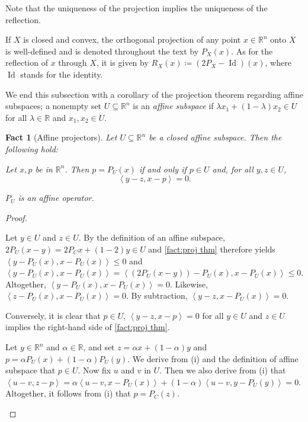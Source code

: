 \documentclass[smallextended,numbook,nospthms]{svjour3}
\theoremstyle{plain}
\newtheorem{fact}[theorem]{Fact}
\theoremstyle{definition}
\def\RR{\mathds R}
\DeclareMathOperator{\Id}{Id}
\newcommand{\scal}[2]{\left\langle{#1},{#2}  \right\rangle}
\begin{document}
Note that the uniqueness of the projection implies the uniqueness of the reflection.

If $X$ is closed and convex, the orthogonal projection of any point $x \in \RR^{n}$ onto $X$ is well-defined and is denoted throughout the text by $P_{X}(x)$. As for the reflection of $x$ through $X$, it is given by $R_{X}(x) \coloneqq (2P_{X}-\Id)(x)$, where $\Id$ stands for the identity.

We end this subsection with a corollary of the projection theorem regarding affine subspaces; a nonempty set $U \subseteq \RR^n$ is an \emph{affine subspace} if $\lambda x_{1}+ (1-\lambda) x_{2} \in U$ for all $\lambda \in \RR$ and $x_{1}, x_{2} \in U$. 
\begin{fact}[Affine projectors]\label{fact:aff proj}
Let $U \subseteq \RR^n$ be a closed affine subspace. Then the following hold:
\begin{listi}
	\item Let $x, p$ be in $\RR^n$. Then $p=P_{U}(x)$ if and only if $p \in U$ and, for all $y, z \in U$, 
	\[
	\scal{y-z}{x-p}=0.
	\]
	\item $P_{U}$ is an affine operator.
\end{listi}
\end{fact}
\begin{proof}
	\begin{listi}
		\item Let $y \in U$ and $z \in U$. By the definition of an affine subspace, $2 P_{U}(x-y)=2 P_{C} x+(1-2) y \in U$ and \cref{fact:proj thm} therefore yields $\scal{y-P_{U}(x)}{x-P_{U}(x)} \leq 0$ and $\scal{y-P_{U}(x)}{x-P_{U}(x)}=\scal{\left(2P_{U}(x-y)\right)-P_{U}(x)}{x-P_{U}(x)} \leq 0$. Altogether, $\scal{y-P_{U}(x)}{x-P_{U}(x)}=0$. Likewise, $\scal{z-P_{U}(x)}{x-P_{U}(x)}=0$. By subtraction, $\scal{y-z}{x-P_{U}(x)}=0$.
		
		Conversely, it is clear that $p \in U$, $\scal{y-z}{x-p}=0$ for all $y \in U$ and $z \in U$ implies the right-hand side of \cref{fact:proj thm}.
		
		\item Let $y \in \RR^n$ and $\alpha \in \RR$, and set $z=\alpha x+(1-\alpha) y$ and $p=\alpha P_{U}(x)+(1-\alpha) P_{U}(y)$. We derive from (i) and the definition of affine subspace that $p \in U$. Now fix $u$ and $v$ in $U$. Then we also derive from (i) that $\scal{u-v}{z-p}=\alpha\scal{u-v}{x-P_{U}(x)}+(1-\alpha)\scal{u-v}{y-P_{U}(y)}=0$. Altogether, it follows from (i) that $p=P_{C}(z)$.
	\end{listi}
\end{proof}
\end{document}
